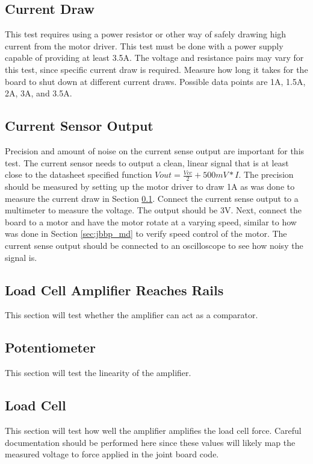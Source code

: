 \documentclass[12pt,letterpaper]{article}
\begin{document}
	\subsection{Current Draw}
	\label{sec:jbbp_cd}
	This test requires using a power resistor or other way of safely drawing high current from the motor driver. This test must be done with a power supply capable of providing at least 3.5A. The voltage and resistance pairs may vary for this test, since specific current draw is required. Measure how long it takes for the board to shut down at different current draws. Possible data points are 1A, 1.5A, 2A, 3A, and 3.5A. %
	
	\subsection{Current Sensor Output}
	Precision and amount of noise on the current sense output are important for this test. The current sensor needs to output a clean, linear signal that is at least close to the datasheet specified function $Vout = \frac{Vcc}{2}+500mV*I$. The precision should be measured by setting up the motor driver to draw 1A as was done to measure the current draw in Section \ref{sec:jbbp_cd}. Connect the current sense output to a multimeter to measure the voltage. The output should be 3V. Next, connect the board to a motor and have the motor rotate at a varying speed, similar to how was done in Section \ref{sec:jbbp_md} to verify speed control of the motor. The current sense output should be connected to an oscilloscope to see how noisy the signal is. %
	
	\subsection{Load Cell Amplifier Reaches Rails}
	This section will test whether the amplifier can act as a comparator. 
	
	\subsection{Potentiometer}
	This section will test the linearity of the amplifier. 
	
	\subsection{Load Cell}
	This section will test how well the amplifier amplifies the load cell force. Careful documentation should be performed here since these values will likely map the measured voltage to force applied in the joint board code.
	
\end{document}
